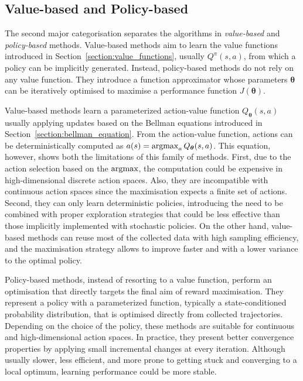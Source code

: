 \subsection{Value-based and Policy-based}

The second major categorisation separates the algorithms in \emph{value-based} and \emph{policy-based} methods.
Value-based methods aim to learn the value functions introduced in Section~\ref{section:value_functions}, usually $Q^\pi(s, a)$, from which a policy can be implicitly generated.
Instead, policy-based methods do not rely on any value function.
They introduce a function approximator whose parameters $\boldsymbol{\theta}$ can be iteratively optimised to maximise a performance function $J(\boldsymbol{\theta})$.

Value-based methods learn a parameterized action-value function $Q_{\boldsymbol{\theta}}(s, a)$ usually applying updates based on the Bellman equations introduced in Section~\ref{section:bellman_equation}.
From the action-value function, actions can be deterministically computed as $a(s) = \operatorname*{argmax}_a Q_{\boldsymbol{\theta}}(s, a)$.
This equation, however, shows both the limitations of this family of methods.
First, due to the action selection based on the $\operatorname*{argmax}$, the computation could be expensive in high-dimensional discrete action spaces.
Also, they are incompatible with continuous action spaces since the maximisation expects a finite set of actions.
Second, they can only learn deterministic policies, introducing the need to be combined with proper exploration strategies that could be less effective than those implicitly implemented with stochastic policies.
On the other hand, value-based methods can reuse most of the collected data with high sampling efficiency, and the maximisation strategy allows to improve faster and with a lower variance to the optimal policy.

Policy-based methods, instead of resorting to a value function, perform an optimisation that directly targets the final aim of reward maximisation.
They represent a policy with a parameterized function, typically a state-conditioned probability distribution, that is optimised directly from collected trajectories.
Depending on the choice of the policy, these methods are suitable for continuous and high-dimensional action spaces.
In practice, they present better convergence properties by applying small incremental changes at every iteration.
Although usually slower, less efficient, and more prone to getting stuck and converging to a local optimum, learning performance could be more stable.

